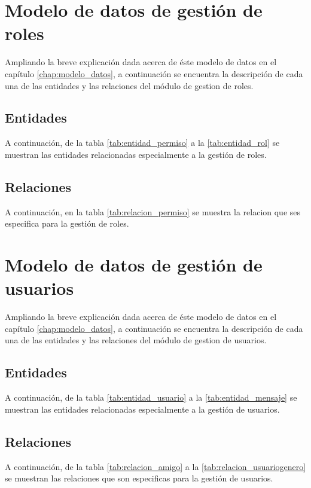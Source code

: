\section{Modelo de datos de gestión de roles}
Ampliando la breve explicación dada acerca de éste modelo de datos en el capítulo \ref{chap:modelo_datos}, a continuación se encuentra la descripción de cada una de las entidades y las relaciones del módulo de gestion de roles.
\subsection{Entidades}
A continuación, de la tabla \ref{tab:entidad_permiso} a la \ref{tab:entidad_rol} se muestran las entidades relacionadas especialmente a la gestión de roles.


\subsection{Relaciones}
A continuación, en la tabla \ref{tab:relacion_permiso} se muestra la relacion que ses especifica para la gestión de roles.



\section{Modelo de datos de gestión de usuarios}
Ampliando la breve explicación dada acerca de éste modelo de datos en el capítulo \ref{chap:modelo_datos}, a continuación se encuentra la descripción de cada una de las entidades y las relaciones del módulo de gestion de usuarios.
\subsection{Entidades}
A continuación, de la tabla \ref{tab:entidad_usuario} a la \ref{tab:entidad_mensaje} se muestran las entidades relacionadas especialmente a la gestión de usuarios.




\subsection{Relaciones}
A continuación, de la tabla \ref{tab:relacion_amigo} a la \ref{tab:relacion_usuariogenero} se muestran las relaciones que son especificas para la gestión de usuarios.




